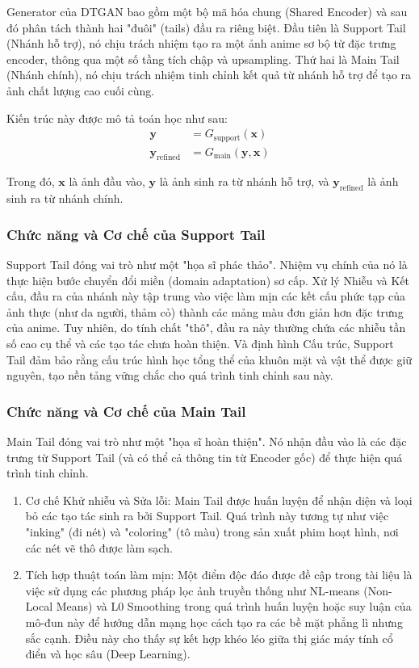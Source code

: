 Generator của DTGAN bao gồm một bộ mã hóa chung (Shared Encoder) và sau đó phân tách thành hai "đuôi" (tails) đầu ra riêng biệt. 
Đầu tiên là Support Tail (Nhánh hỗ trợ), nó chịu trách nhiệm tạo ra một ảnh anime sơ bộ từ đặc trưng encoder, thông qua một số tầng tích chập và upsampling. 
Thứ hai là Main Tail (Nhánh chính), nó chịu trách nhiệm tinh chỉnh  kết quả từ nhánh hỗ trợ để tạo ra ảnh chất lượng cao cuối cùng.

Kiến trúc này được mô tả toán học như sau:
\begin{align}
\mathbf{y} &= G_{\text{support}}(\mathbf{x}) \\
\mathbf{y}_{\text{refined}} &= G_{\text{main}}(\mathbf{y}, \mathbf{x})
\end{align}

Trong đó, $\mathbf{x}$ là ảnh đầu vào, $\mathbf{y}$ là ảnh sinh ra từ nhánh hỗ trợ, và $\mathbf{y}_{\text{refined}}$ là ảnh sinh ra từ nhánh chính.

\subsubsection{Chức năng và Cơ chế của Support Tail}
Support Tail đóng vai trò như một "họa sĩ phác thảo". Nhiệm vụ chính của nó là thực hiện bước chuyển đổi miền (domain adaptation) sơ cấp.
Xử lý Nhiễu và Kết cấu, đầu ra của nhánh này tập trung vào việc làm mịn các kết cấu phức tạp của ảnh thực (như da người, thảm cỏ) thành các mảng màu đơn giản hơn đặc trưng của anime. Tuy nhiên, do tính chất "thô", đầu ra này thường chứa các nhiễu tần số cao cụ thể và các tạo tác chưa hoàn thiện.   
Và định hình Cấu trúc, Support Tail đảm bảo rằng cấu trúc hình học tổng thể của khuôn mặt và vật thể được giữ nguyên, tạo nền tảng vững chắc cho quá trình tinh chỉnh sau này.

\subsubsection{Chức năng và Cơ chế của Main Tail}
Main Tail đóng vai trò như một "họa sĩ hoàn thiện". Nó nhận đầu vào là các đặc trưng từ Support Tail (và có thể cả thông tin từ Encoder gốc) để thực hiện quá trình tinh chỉnh.
\begin{enumerate}
    \item Cơ chế Khử nhiễu và Sửa lỗi: Main Tail được huấn luyện để nhận diện và loại bỏ các tạo tác sinh ra bởi Support Tail. Quá trình này tương tự như việc "inking" (đi nét) và "coloring" (tô màu) trong sản xuất phim hoạt hình, nơi các nét vẽ thô được làm sạch.
    \item Tích hợp thuật toán làm mịn: Một điểm độc đáo được đề cập trong tài liệu là việc sử dụng các phương pháp lọc ảnh truyền thống như NL-means (Non-Local Means) và L0 Smoothing trong quá trình huấn luyện hoặc suy luận của mô-đun này để hướng dẫn mạng học cách tạo ra các bề mặt phẳng lì nhưng sắc cạnh. Điều này cho thấy sự kết hợp khéo léo giữa thị giác máy tính cổ điển và học sâu (Deep Learning).
\end{enumerate}

